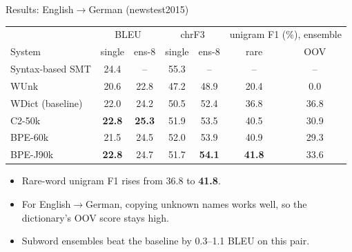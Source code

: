 \documentclass[aspectratio=169,11pt]{beamer}
\begin{document}
\begin{frame}{Results: English$\to$German (newstest2015)}
  \footnotesize
  \begin{tabular}{@{}lcccccc@{}}
    \toprule
    & \multicolumn{2}{c}{BLEU} & \multicolumn{2}{c}{chrF3} & \multicolumn{2}{c}{unigram F1 (\%), ensemble}\\
    System & single & ens-8 & single & ens-8 & rare & OOV\\
    \midrule
    Syntax-based SMT & 24.4 & -- & 55.3 & -- & -- & --\\
    WUnk & 20.6 & 22.8 & 47.2 & 48.9 & 20.4 & 0.0\\
    WDict (baseline) & 22.0 & 24.2 & 50.5 & 52.4 & 36.8 & 36.8\\
    C2-50k & \textbf{22.8} & \textbf{25.3} & 51.9 & 53.5 & 40.5 & 30.9\\
    BPE-60k & 21.5 & 24.5 & 52.0 & 53.9 & 40.9 & 29.3\\
    BPE-J90k & \textbf{22.8} & 24.7 & 51.7 & \textbf{54.1} & \textbf{41.8} & 33.6\\
    \bottomrule
  \end{tabular}
  \vspace{2mm}
  \small
  \begin{itemize}
    \item Rare-word unigram F1 rises from 36.8 to \textbf{41.8}.
    \item For English$\to$German, copying unknown names works well, so the dictionary's OOV score stays high.
    \item Subword ensembles beat the baseline by 0.3--1.1 BLEU on this pair.
  \end{itemize}
\end{frame}
\end{document}
